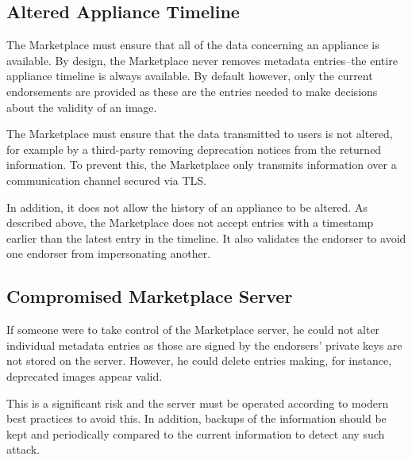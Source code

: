 \subsection{Altered Appliance Timeline}

The Marketplace must ensure that all of the data concerning an
appliance is available.  By design, the Marketplace never removes
metadata entries--the entire appliance timeline is always available.
By default however, only the current endorsements are provided as
these are the entries needed to make decisions about the validity of
an image.  

The Marketplace must ensure that the data transmitted to users is not
altered, for example by a third-party removing deprecation notices
from the returned information.  To prevent this, the Marketplace only
transmits information over a communication channel secured via TLS\@.

In addition, it does not allow the history of an appliance to be
altered.  As described above, the Marketplace does not accept entries
with a timestamp earlier than the latest entry in the timeline.  It
also validates the endorser to avoid one endorser from impersonating
another.

\subsection{Compromised Marketplace Server}

If someone were to take control of the Marketplace server, he could
not alter individual metadata entries as those are signed by the
endorsers' private keys are not stored on the server.  However, he
could delete entries making, for instance, deprecated images appear
valid.

This is a significant risk and the server must be operated according
to modern best practices to avoid this.  In addition, backups of the
information should be kept and periodically compared to the current
information to detect any such attack.
